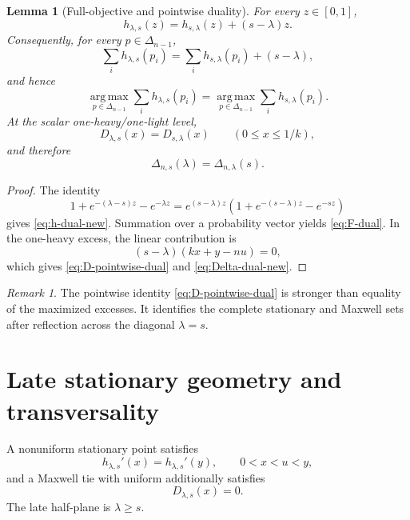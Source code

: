 \documentclass[11pt]{article}
\theoremstyle{plain}
\newtheorem{lemma}[theorem]{Lemma}
\theoremstyle{definition}
\theoremstyle{remark}
\newtheorem{remark}[theorem]{Remark}
\newcommand{\simplex}{\Delta_{n-1}}
\newcommand{\Argmax}{\operatorname*{arg\,max}}
\begin{document}
\begin{lemma}[Full-objective and pointwise duality]\label{lem:full-duality}
For every \(z\in[0,1]\),
\begin{equation}\label{eq:h-dual-new}
h_{\lambda,s}(z)=h_{s,\lambda}(z)+(s-\lambda)z.
\end{equation}
Consequently, for every \(p\in\simplex\),
\begin{equation}\label{eq:F-dual}
\sum_i h_{\lambda,s}(p_i)
=
\sum_i h_{s,\lambda}(p_i)+(s-\lambda),
\end{equation}
and hence
\begin{equation}\label{eq:argmax-dual}
\Argmax_{p\in\simplex}\sum_i h_{\lambda,s}(p_i)
=
\Argmax_{p\in\simplex}\sum_i h_{s,\lambda}(p_i).
\end{equation}
At the scalar one-heavy/one-light level,
\begin{equation}\label{eq:D-pointwise-dual}
D_{\lambda,s}(x)=D_{s,\lambda}(x)
\qquad(0\le x\le1/k),
\end{equation}
and therefore
\begin{equation}\label{eq:Delta-dual-new}
\Delta_{n,s}(\lambda)=\Delta_{n,\lambda}(s).
\end{equation}
\end{lemma}

\begin{proof}
The identity
\[
1+e^{-(\lambda-s)z}-e^{-\lambda z}
=e^{(s-\lambda)z}
\left(1+e^{-(s-\lambda)z}-e^{-sz}\right)
\]
gives \eqref{eq:h-dual-new}.  Summation over a probability vector yields \eqref{eq:F-dual}.  In the one-heavy excess, the linear contribution is
\[
(s-\lambda)(kx+y-nu)=0,
\]
which gives \eqref{eq:D-pointwise-dual} and \eqref{eq:Delta-dual-new}.
\end{proof}

\begin{remark}
The pointwise identity \eqref{eq:D-pointwise-dual} is stronger than equality of the maximized excesses.  It identifies the complete stationary and Maxwell sets after reflection across the diagonal \(\lambda=s\).
\end{remark}

\section{Late stationary geometry and transversality}

A nonuniform stationary point satisfies
\begin{equation}\label{eq:stationary-new}
h_{\lambda,s}'(x)=h_{\lambda,s}'(y),
\qquad 0<x<u<y,
\end{equation}
and a Maxwell tie with uniform additionally satisfies
\begin{equation}\label{eq:maxwell-new}
D_{\lambda,s}(x)=0.
\end{equation}
The late half-plane is \(\lambda\ge s\).
\end{document}
